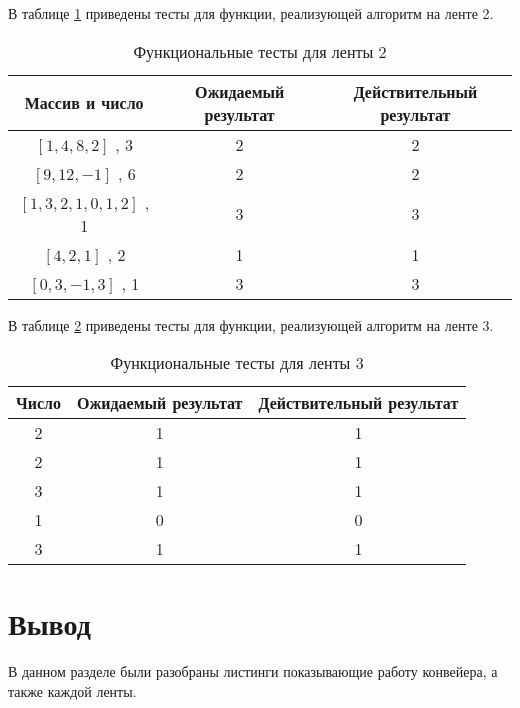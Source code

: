 В таблице \ref{tbl:ft3} приведены тесты для функции, реализующей алгоритм на ленте 2.

\begin{table}[!h]
	\begin{center}
		\caption{\label{tbl:ft3} Функциональные тесты для ленты 2}
		\begin{tabular}{|c|c|c|}
			\hline
			Массив и число & Ожидаемый результат & Действительный результат \\ 
			\hline
			$[1,4,8,2]$ , 3        & 2 & 2\\
			$[9,12,-1]$ , 6        & 2 & 2\\
			$[1,3,2,1,0,1,2]$ , 1  & 3 & 3\\
			$[4,2,1]$ , 2          & 1 & 1\\
			$[0,3,-1,3]$ , 1       & 3 & 3\\
			\hline
		\end{tabular}
	\end{center}
\end{table}

В таблице \ref{tbl:ft4} приведены тесты для функции, реализующей алгоритм на ленте 3.

\begin{table}[h]
	\begin{center}
		\caption{\label{tbl:ft4} Функциональные тесты для ленты 3}
		\begin{tabular}{|c|c|c|}
			\hline
			Число & Ожидаемый результат & Действительный результат \\ 
			\hline
			2  & 1 & 1\\
			2  & 1 & 1\\
			3  & 1 & 1\\
			1  & 0 & 0\\
			3  & 1 & 1\\
			\hline
		\end{tabular}
	\end{center}
\end{table}


\section{Вывод}
В данном разделе были разобраны листинги  показывающие
работу конвейера, а также каждой ленты.
